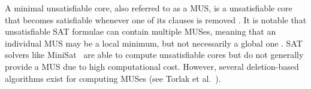 A minimal unsatisfiable core, also referred to as a \ac{MUS}, is a unsatisfiable core that becomes satisfiable whenever one of its clauses is removed \cite{dershowitz2006scalable}. It is notable that unsatisfiable SAT formulae can contain multiple MUSes, meaning that an individual MUS may be a local minimum, but not necessarily a global one \cite{liffiton2008algorithms}. SAT solvers like MiniSat~\cite{een2003extensible} are able to compute unsatisfiable cores but do not generally provide a MUS due to high computational cost. However, several deletion-based algorithms exist for computing MUSes (see Torlak et al.~\cite{10.1007/978-3-540-68237-0_23}).